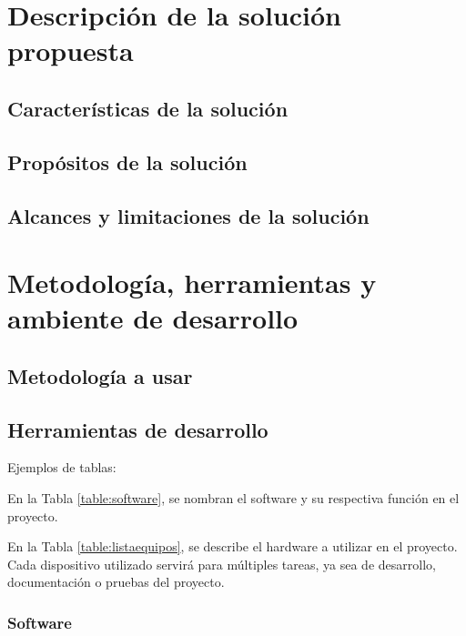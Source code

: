     \section{Descripción de la solución propuesta}
    
    \subsection{Características de la solución}
	
    \subsection{Propósitos de la solución}

	\subsection{Alcances y limitaciones de la solución}
    
    \section{Metodología, herramientas y ambiente de desarrollo}
   
    \subsection{Metodología a usar}
  
    \subsection{Herramientas de desarrollo}
     Ejemplos de tablas:
     
     En la Tabla \ref{table:software}, se nombran el software y su respectiva función en el proyecto. 
    
    En la Tabla \ref{table:listaequipos}, se describe el hardware a utilizar en el proyecto. Cada dispositivo utilizado servirá para múltiples tareas, ya sea de desarrollo, documentación o pruebas del proyecto.
   
    \subsubsection{Software}
        
